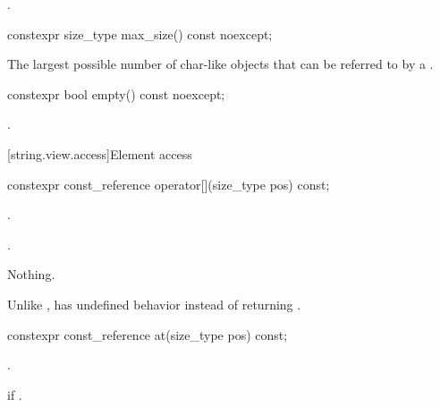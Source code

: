 \begin{itemdescr}
\pnum
\returns
{}.
\end{itemdescr}


%
\begin{itemdecl}
constexpr size_type max_size() const noexcept;
\end{itemdecl}

\begin{itemdescr}
\pnum
\returns
The largest possible number of char-like objects that can be referred to by a .
\end{itemdescr}

%
\begin{itemdecl}
constexpr bool empty() const noexcept;
\end{itemdecl}

\begin{itemdescr}
\pnum
\returns
{}.
\end{itemdescr}

[string.view.access]{Element access}

%
\begin{itemdecl}
constexpr const_reference operator[](size_type pos) const;
\end{itemdecl}

\begin{itemdescr}
\pnum
\expects
{}.

\pnum
\returns
{}.

\pnum
\throws
Nothing.

\pnum
\begin{note}
Unlike ,
 has undefined behavior instead of returning .
\end{note}
\end{itemdescr}

%
\begin{itemdecl}
constexpr const_reference at(size_type pos) const;
\end{itemdecl}

\begin{itemdescr}
\pnum
\returns
{}.

\pnum
\throws
{} if .
\end{itemdescr}


